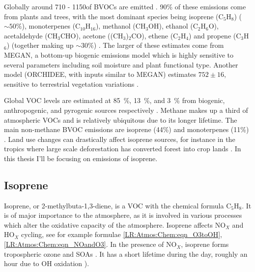     Globally around 710 - 1150\tgcpyr of BVOCs are emitted \parencite{Guenther1995,Lathiere2006,Guenther2012, Lathiere2016}.
    90\% of these emissions come from plants and trees, with the most dominant species being isoprene (C$_5$H$_8$) ($\sim50\%$), monoterpenes (C$_10$H$_16$), methanol (CH$_3$OH), ethanol (C$_2$H$_6$O), acetaldehyde (CH$_3$CHO), acetone ((CH$_3$)$_2$CO), ethene (C$_2$H$_4$) and propene (C$_3$H$_6$) (together making up $\sim30\%$) \parencite{Guenther2012}.
    The larger of these estimates come from MEGAN, a bottom-up biogenic emissions model which is highly sensitive to several parameters including soil moisture and plant functional type.
    Another model (ORCHIDEE, with inputs similar to MEGAN) estimates $752\pm16$\tgcpyr, sensitive to terrestrial vegetation variations \parencite{Lathiere2006}.
    
    Global VOC levels are estimated at 85~\%, 13~\%, and 3~\% from biogenic, anthropogenic, and pyrogenic sources respectively \parencite{Kanakidou2005, Kefauver2014}.
    Methane makes up a third of atmospheric VOCs and is relatively ubiquitous due to its longer lifetime.
    The main non-methane BVOC emissions are isoprene (44\%) and monoterpenes (11\%) \parencite{Guenther2000, Kefauver2014}. 
    Land use changes can drastically affect isoprene sources, for instance in the tropics where large scale deforestation has converted forest into crop lands \parencite{Kanakidou2005}.
    In this thesis I'll be focusing on emissions of isoprene.
    
    
  \subsection{Isoprene}
  \label{LR:VOCs:Isop}
    Isoprene, or 2-methylbuta-1,3-diene, is a VOC with the chemical formula C$_5$H$_8$. 
    It is of major importance to the atmosphere, as it is involved in various processes which alter the oxidative capacity of the atmosphere.
    Isoprene affects NO$_X$ and HO$_X$ cycling, see for example formulae \ref{LR:Atmos:Chem:eqn_O3toOH}, \ref{LR:Atmos:Chem:eqn_NOandO3}.
    In the presence of NO$_X$, isoprene forms tropospheric ozone and SOAs \parencite{Wagner2002, Millet2006}.
    It has a short lifetime during the day, roughly an hour due to OH oxidation \parencite{AtkinsonArey2003}).
    
